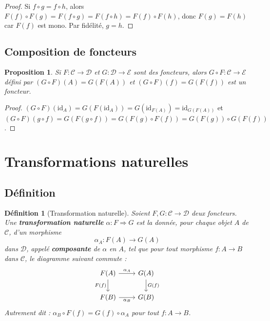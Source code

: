 \documentclass[a4paper,12pt]{book}
\newcommand{\id}{\mathrm{id}}
\newtheorem{proposition}[theoreme]{Proposition}
\newtheorem{definition}[theoreme]{Définition}
\begin{document}
\begin{proof}
Si $f \circ g = f \circ h$, alors $F(f) \circ F(g) = F(f \circ g) = F(f \circ h) = F(f) \circ F(h)$, donc $F(g) = F(h)$ car $F(f)$ est mono. Par fidélité, $g = h$.
\end{proof}

\subsection{Composition de foncteurs}

\begin{proposition}\label{prop:comp-foncteurs}
Si $F : \mathcal{C} \to \mathcal{D}$ et $G : \mathcal{D} \to \mathcal{E}$ sont des foncteurs, alors $G \circ F : \mathcal{C} \to \mathcal{E}$ défini par $(G \circ F)(A) = G(F(A))$ et $(G \circ F)(f) = G(F(f))$ est un foncteur.
\end{proposition}

\begin{proof}
$(G \circ F)(\id_A) = G(F(\id_A)) = G(\id_{F(A)}) = \id_{G(F(A))}$ et $(G \circ F)(g \circ f) = G(F(g \circ f)) = G(F(g) \circ F(f)) = G(F(g)) \circ G(F(f))$.
\end{proof}

\section{Transformations naturelles}

\subsection{Définition}

\begin{definition}[Transformation naturelle]\label{def:transfo-nat}
Soient $F, G : \mathcal{C} \to \mathcal{D}$ deux foncteurs. Une \textbf{transformation naturelle} $\alpha : F \Rightarrow G$ est la donnée, pour chaque objet $A$ de $\mathcal{C}$, d'un morphisme
\[
  \alpha_A : F(A) \longrightarrow G(A)
\]
dans $\mathcal{D}$, appelé \textbf{composante} de $\alpha$ en $A$, tel que pour tout morphisme $f : A \to B$ dans $\mathcal{C}$, le diagramme suivant commute :
\[
\begin{tikzcd}
  F(A) \arrow[r, "\alpha_A"] \arrow[d, "F(f)"'] & G(A) \arrow[d, "G(f)"] \\
  F(B) \arrow[r, "\alpha_B"'] & G(B)
\end{tikzcd}
\]
Autrement dit : $\alpha_B \circ F(f) = G(f) \circ \alpha_A$ pour tout $f : A \to B$.
\end{definition}
\end{document}
